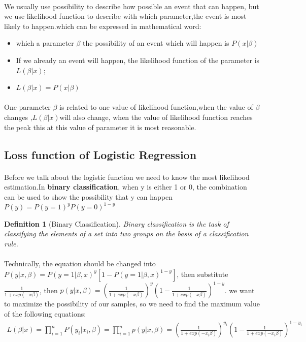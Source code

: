 \documentclass[a4paper,12pt]{article}
\newtheorem{definition}{Definition}[section]
\begin{document}
\begin{spacing}{2}
\paragraph{ }We usually use possibility to describe how possible an event that can happen, but we use likelihood function to describe with which parameter,the event is most likely to happen.which can be expressed in mathematical word:
\begin{itemize}
  \item which a parameter $\beta$ the possibility of an event which will happen is $P(x|\beta)$
  \item If we already an event will happen, the likelihood function of the parameter is $L(\beta|x);$
  \item $L(\beta|x)=P(x|\beta)$
\end{itemize}
\paragraph{ }One parameter $\beta$ is related to one value of likelihood function,when the value of $\beta$ changes ,$L(\beta|x)$will also change, when the value of likelihood function reaches the peak this at this value of parameter it is most reasonable.

\subsection{Loss function of Logistic Regression}
\paragraph{ }Before we talk about the logistic function we need to know the most likelihood estimation.In \textbf{binary classification}, when y is either 1 or 0, the combination can be used to show the possibility   that y can happen $P(y)=P(y=1)^{y}P(y=0)^{1-y}$
\begin{definition}[Binary Classification]Binary classification is the task of classifying the elements of a set into two groups on the basis of a classification rule. 
\end{definition}
\paragraph{ } Technically, the equation should be changed into $P(y|x,\beta)=P(y=1|\beta,x)^{y}[1-P(y=1|\beta,x)^{1-y}]$, then substitute $\frac{1}{1+exp(-x\beta)}$, then $ p(y|x,\beta)=(\frac{1}{1+exp(-x\beta)})^{y}(1-\frac{1}{1+exp(-x\beta)})^{1-y}$. we want to maximize the possibility of our samples, so we need to find the maximum value of the following equations:
\begin{align}
L(\beta|x)=\prod_{i=1}^{n}P(y_{i}|x_{i},\beta)=\prod_{i=1}^{n}p(y|x,\beta)=(\frac{1}{1+exp(-x_{i}\beta)})^{y_{i}}(1-\frac{1}{1+exp(-x_{i}\beta)})^{1-y_{i}}
\end{align}

\end{spacing}
\end{document}
